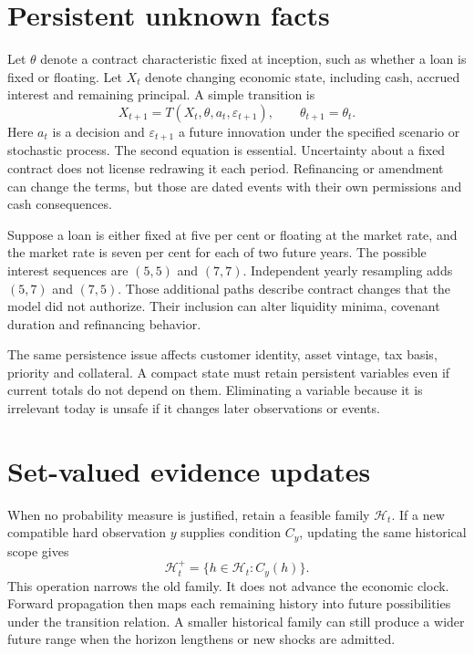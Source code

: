 \section{Persistent unknown facts}
Let $\theta$ denote a contract characteristic fixed at inception, such as whether a loan is fixed or floating. Let $X_t$ denote changing economic state, including cash, accrued interest and remaining principal. A simple transition is
\begin{equation}
 X_{t+1}=T(X_t,\theta,a_t,\varepsilon_{t+1}),\qquad \theta_{t+1}=\theta_t.
 \label{sim:persistent-theta}
\end{equation}
Here $a_t$ is a decision and $\varepsilon_{t+1}$ a future innovation under the specified scenario or stochastic process. The second equation is essential. Uncertainty about a fixed contract does not license redrawing it each period. Refinancing or amendment can change the terms, but those are dated events with their own permissions and cash consequences.

Suppose a loan is either fixed at five per cent or floating at the market rate, and the market rate is seven per cent for each of two future years. The possible interest sequences are $(5,5)$ and $(7,7)$. Independent yearly resampling adds $(5,7)$ and $(7,5)$. Those additional paths describe contract changes that the model did not authorize. Their inclusion can alter liquidity minima, covenant duration and refinancing behavior.

The same persistence issue affects customer identity, asset vintage, tax basis, priority and collateral. A compact state must retain persistent variables even if current totals do not depend on them. Eliminating a variable because it is irrelevant today is unsafe if it changes later observations or events.

\section{Set-valued evidence updates}
When no probability measure is justified, retain a feasible family $\mathcal H_t$. If a new compatible hard observation $y$ supplies condition $C_y$, updating the same historical scope gives
\begin{equation}
 \mathcal H_{t}^{+}=\{h\in\mathcal H_t:C_y(h)\}.
 \label{sim:set-update}
\end{equation}
This operation narrows the old family. It does not advance the economic clock. Forward propagation then maps each remaining history into future possibilities under the transition relation. A smaller historical family can still produce a wider future range when the horizon lengthens or new shocks are admitted.

